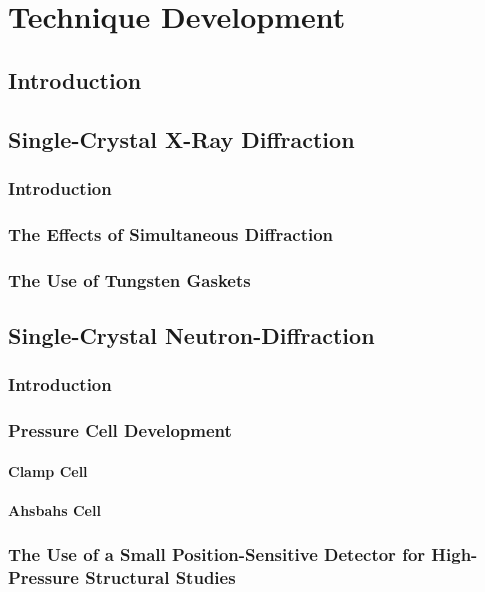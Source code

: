 \chapter{Technique Development}

\section{Introduction}

\section{Single-Crystal X-Ray Diffraction}

\subsection{Introduction}

\subsection{The Effects of Simultaneous Diffraction}

\subsection{The Use of Tungsten Gaskets}

\section{Single-Crystal Neutron-Diffraction}

\subsection{Introduction}

\subsection{Pressure Cell Development}

\subsubsection{Clamp Cell}

\subsubsection{Ahsbahs Cell}

\subsection{The Use of a Small Position-Sensitive Detector for
High-Pressure Structural Studies}

